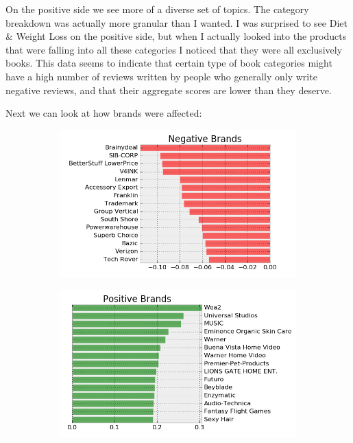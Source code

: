 \documentclass[a4paper,10pt]{article}
\begin{document}
On the positive side we see more of a diverse set of topics. The category breakdown was actually more granular than I wanted. I was surprised to see Diet \& Weight Loss on the positive side, but when I actually looked into the products that were falling into all these categories I noticed that they were all exclusively books. This data seems to indicate that certain type of book categories might have a high number of reviews written by people who generally only write negative reviews, and that their aggregate scores are lower than they deserve.

Next we can look at how brands were affected:

\begin{figure}[H]
\centering
\begin{subfigure}{.5\textwidth}
  \centering
  \includegraphics[width=1\linewidth]{change_by_brand_neg.png}
  \label{fig:sub1}
\end{subfigure}%
\begin{subfigure}{.5\textwidth}
  \centering
  \includegraphics[width=1\linewidth]{change_by_brand_pos.png}
  \label{fig:sub2}
\end{subfigure}
\label{fig:test}
\end{figure}
\end{document}
